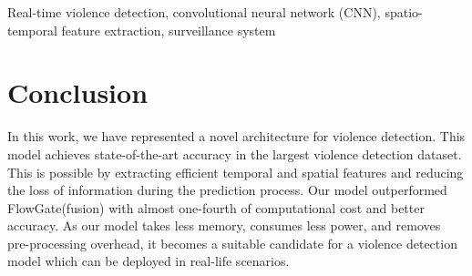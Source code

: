 \documentclass[conference]{IEEEtran}
\begin{document}
\begin{IEEEkeywords}
Real-time violence detection, convolutional neural network (CNN), spatio-temporal feature extraction, surveillance system
\end{IEEEkeywords}    
            

	
	

 
    

      
      
    \section{Conclusion}
    In this work, we have represented a novel architecture for violence detection. 
    This model achieves state-of-the-art accuracy in the largest violence detection dataset. 
    This is possible by extracting efficient temporal and spatial features and reducing the loss of information during the prediction process.
    Our model outperformed FlowGate(fusion) with almost one-fourth of computational cost and better accuracy.
    As our model takes less memory, consumes less power, and removes pre-processing overhead, it becomes a suitable candidate for a violence detection model which can be deployed in real-life scenarios.
    
    
    
{\small


}
\end{document}
